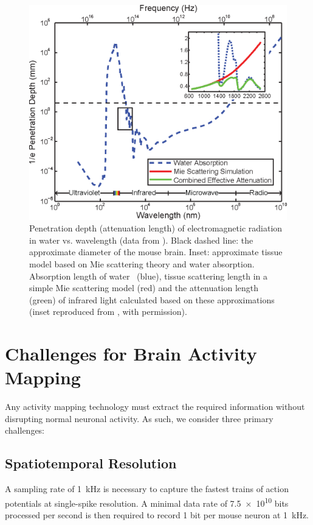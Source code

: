 \begin{figure}[htbp]
\caption{%
Penetration depth (attenuation length) of electromagnetic radiation in water vs. wavelength (data from \cite{jonasz07}).
Black dashed line: the approximate diameter of the mouse brain.
Inset: approximate tissue model based on Mie scattering theory and water absorption. Absorption length of water~\cite{kou93} (blue), tissue scattering length in a simple Mie scattering model (red) and the attenuation length (green) of infrared light calculated based on these approximations (inset reproduced from \cite{kou93}, with permission).}
\label{fig:attenuation}
\centering
\includegraphics[width=0.5\linewidth]{figs/Fig2.eps}
\end{figure}

\section{Challenges for Brain Activity Mapping}
\label{sec:challenges}
Any activity mapping technology must extract the required information without disrupting normal neuronal activity.
As such, we consider three primary challenges:

\subsection{Spatiotemporal Resolution}

A sampling rate of \SI{1}{\kilo\hertz} is necessary to capture the fastest trains of action potentials at single-spike resolution.
A minimal data rate of \num{7.5e10} bits processed per second is then required to record 1 bit per mouse neuron at \SI{1}{\kilo\hertz}.


